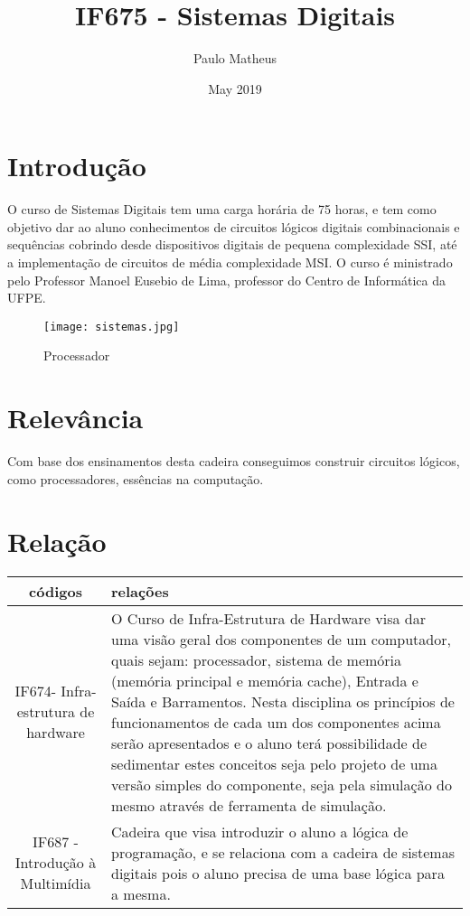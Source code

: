 \documentclass[10pt]{article}
\title{IF675 - Sistemas Digitais}
\author{Paulo Matheus}
\date{May 2019}
\begin{document}
\maketitle

\section{Introdução}
O curso de Sistemas Digitais tem uma carga horária de 75 horas, e tem como objetivo dar ao aluno conhecimentos de circuitos lógicos digitais combinacionais e sequências cobrindo desde dispositivos digitais de pequena complexidade SSI, até a implementação de circuitos de média complexidade MSI.
O curso é ministrado pelo Professor Manoel Eusebio de Lima,  professor do Centro de Informática da UFPE.
\cite{intro}


\begin{figure}[h!]
\centering
\texttt{[image: sistemas.jpg]}
\caption{Processador}
\label{fig:processador}
\end{figure}


\section{Relevância}
Com base dos ensinamentos desta cadeira conseguimos construir circuitos lógicos, como processadores, essências na computação.

\section{Relação}

\begin{center}
\begin{tabular}{|c|p{6cm}|}
\hline
códigos & relações \\ \hline
 IF674- Infra-estrutura de hardware &
 O Curso de Infra-Estrutura de Hardware visa dar uma visão geral dos componentes de um computador, quais sejam: processador, sistema de memória (memória principal e memória cache), Entrada e Saída e Barramentos. Nesta disciplina os princípios de funcionamentos de cada um dos componentes acima serão apresentados e o aluno terá possibilidade de sedimentar estes conceitos seja pelo projeto de uma versão simples do componente, seja pela simulação do mesmo através de ferramenta de simulação. \cite{IF674}
 \\ \hline
  IF687 - Introdução à Multimídia  & 
Cadeira que visa introduzir o aluno a lógica de programação, e se relaciona com a cadeira de sistemas digitais pois o aluno precisa de uma base lógica para a mesma. \cite{IF669}
\\ \hline

\end{tabular}    
\end{center}



\end{document}
